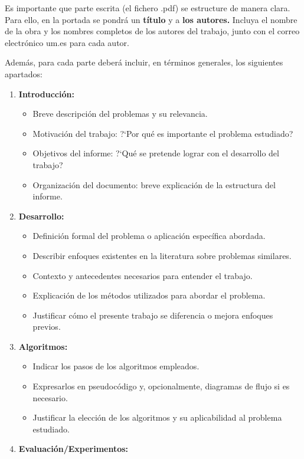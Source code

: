 \documentclass[a4paper, 11pt]{article}
\begin{document}
Es importante que parte escrita (el fichero .pdf) se  estructure de manera clara. 
Para ello, en la portada se pondrá un \textbf{título} y a \textbf{los autores.} Incluya el nombre de la obra y los nombres completos de los autores del trabajo, junto con el correo electrónico um.es para cada autor.

Además, para cada parte deberá incluir, en términos generales,  los siguientes apartados:  


\begin{enumerate}
    \item \textbf{Introducción:}
    \begin{itemize}
        \item Breve descripción del problemas y su relevancia.
        \item Motivación del trabajo: ?`Por qué es importante el problema estudiado?
        \item Objetivos del informe: ?`Qué se pretende lograr con el desarrollo del trabajo?
        \item Organización del documento: breve explicación de la estructura del informe.
    \end{itemize}
    \item \textbf{Desarrollo:} 
    \begin{itemize}
        \item Definición formal del problema o aplicación específica abordada.
        \item Describir enfoques existentes en la literatura sobre problemas similares.
        \item Contexto y antecedentes necesarios para entender el trabajo.
        \item Explicación de los métodos utilizados para abordar el problema.
        \item Justificar cómo el presente trabajo se diferencia o mejora enfoques previos.
    \end{itemize}
    \item \textbf{Algoritmos:}
    \begin{itemize}
        \item Indicar los pasos de los algoritmos empleados.
        \item Expresarlos en pseudocódigo y, opcionalmente, diagramas de flujo si es necesario.
        \item Justificar la elección de los algoritmos y su aplicabilidad al problema estudiado.
    \end{itemize}
    \item \textbf{Evaluación/Experimentos:}

\end{enumerate}
\end{document}
